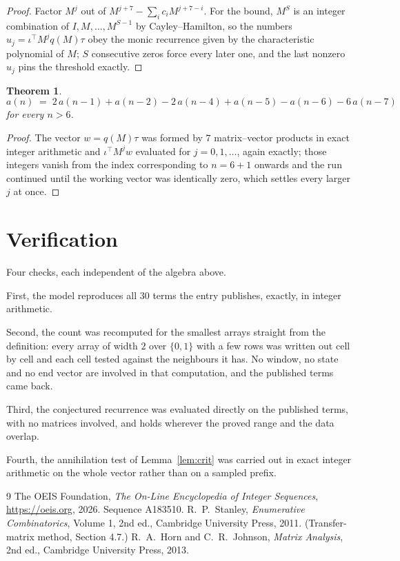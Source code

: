 \documentclass[11pt,a4paper]{article}
\theoremstyle{plain}
\newtheorem{theorem}{Theorem}
\theoremstyle{definition}
\begin{document}
\begin{proof}
Factor $M^{j}$ out of $M^{j+7}-\sum_ic_iM^{j+7-i}$. For the bound, $M^{S}$
is an integer combination of $I,M,\dots,M^{S-1}$ by Cayley--Hamilton, so the numbers
$u_j=\iota^{\!\top}M^{j}q(M)\tau$ obey the monic recurrence given by the characteristic
polynomial of $M$; $S$ consecutive zeros force every later one, and the last nonzero $u_j$
pins the threshold exactly.
\end{proof}

\begin{theorem}
\[
a(n)\;=\;2\,a(n-1) + a(n-2) - 2\,a(n-4) + a(n-5) - a(n-6) - 6\,a(n-7)
\]
for every $n>6$.
\end{theorem}

\begin{proof}
The vector $w=q(M)\tau$ was formed by $7$ matrix--vector products in exact integer
arithmetic and $\iota^{\!\top}M^{j}w$ evaluated for $j=0,1,\dots$, again exactly; those
integers vanish from the index corresponding to $n=6+1$ onwards and the run continued
until the working vector was identically zero, which settles every larger $j$ at once.
\end{proof}

\section{Verification}

Four checks, each independent of the algebra above.

First, the model reproduces all $30$ terms the entry publishes, exactly, in integer
arithmetic.

Second, the count was recomputed for the smallest arrays straight from the definition: every
array of width $2$ over $\{0,1\}$ with a few rows was written out cell by cell and each cell
tested against the neighbours it has. No window, no state and no end vector are involved in that
computation, and the published terms came back.

Third, the conjectured recurrence was evaluated directly on the published terms, with no
matrices involved, and holds wherever the proved range and the data overlap.

Fourth, the annihilation test of Lemma~\ref{lem:crit} was carried out in exact integer
arithmetic on the whole vector rather than on a sampled prefix.

\begin{thebibliography}{9}
 The OEIS Foundation, \emph{The On-Line Encyclopedia of Integer
Sequences}, \url{https://oeis.org}, 2026. Sequence A183510.
 R.~P.~Stanley, \emph{Enumerative Combinatorics}, Volume 1, 2nd ed.,
Cambridge University Press, 2011. (Transfer-matrix method, Section 4.7.)
 R.~A.~Horn and C.~R.~Johnson, \emph{Matrix Analysis}, 2nd ed., Cambridge
University Press, 2013.
\end{thebibliography}
\end{document}
